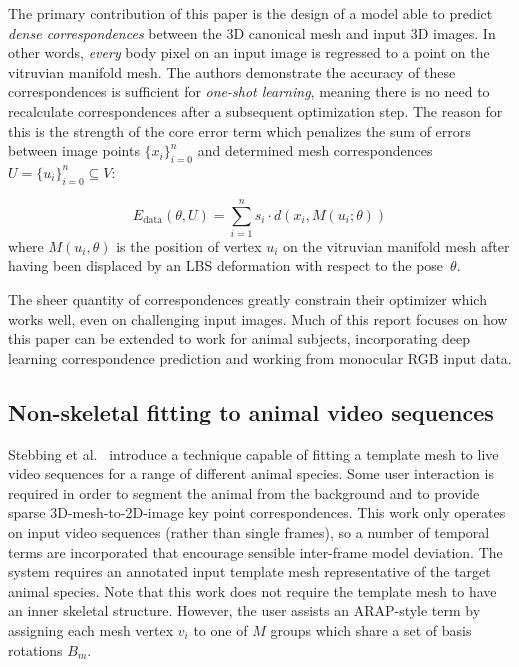         The primary contribution of this paper is the design of a model able to predict \emph{dense correspondences} between the 3D canonical mesh and input 3D images. In other words, \emph{every} body pixel on an input image is regressed to a point on the vitruvian manifold mesh. The authors demonstrate the accuracy of these correspondences is sufficient for \emph{one-shot learning}, meaning there is no need to recalculate correspondences after a subsequent optimization step. The reason for this is the strength of the core error term which penalizes the sum of errors between image points $\{x_{i}\}_{i=0}^{n}$ and determined mesh correspondences $U = \{u_{i}\}_{i=0}^{n} \subseteq V$:

        \begin{equation}
            E_{\text{data}}(\theta,U) =\sum_{i=1}^{n}s_{i} \cdot d(x_{i}, M(u_{i}; \theta))
        \end{equation}
        where $M(u_{i}, \theta)$ is the position of vertex $u_{i}$ on the vitruvian manifold mesh after having been displaced by an LBS deformation with respect to the pose~$\theta$. 
        
        The sheer quantity of correspondences greatly constrain their optimizer which works well, even on challenging input images. Much of this report focuses on how this paper can be extended to work for animal subjects, incorporating deep learning correspondence prediction and working from monocular RGB input data.

        \subsection{Non-skeletal fitting to animal video sequences}
        Stebbing et al.~\cite{arap_stebbing} introduce a technique capable of fitting a template mesh to live video sequences for a range of different animal species. Some user interaction is required in order to segment the animal from the background and to provide sparse 3D-mesh-to-2D-image key point correspondences. This work only operates on input video sequences (rather than single frames), so a number of temporal terms are incorporated that encourage sensible inter-frame model deviation. The system requires an annotated input template mesh representative of the target animal species. Note that this work does not require the template mesh to have an inner skeletal structure. However, the user assists an ARAP-style term by assigning each mesh vertex $v_i$ to one of $M$ groups which share a set of basis rotations $B_{m}$. 

